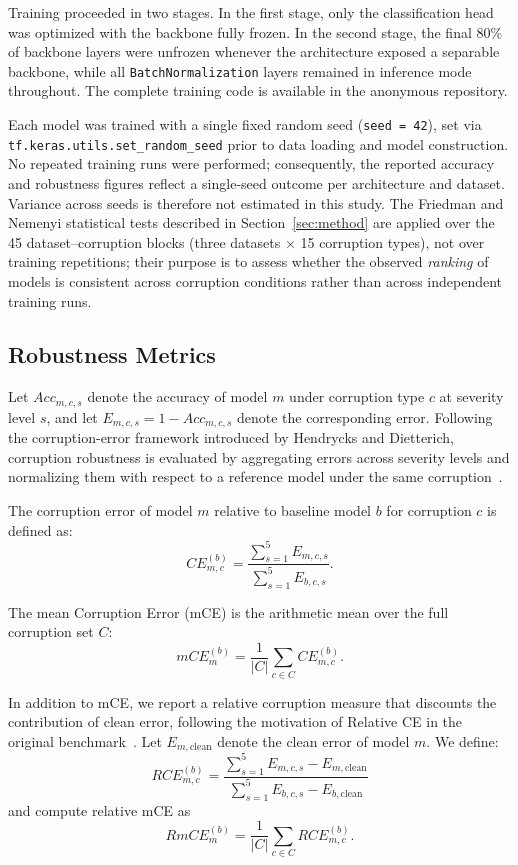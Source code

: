 \documentclass[runningheads]{llncs}
\begin{document}
Training proceeded in two stages. In the first stage, only the classification
head was optimized with the backbone fully frozen. In the second stage, the
final 80\% of backbone layers were unfrozen whenever the architecture exposed
a separable backbone, while all \texttt{BatchNormalization} layers remained in
inference mode throughout. The complete training code is available in the
anonymous repository.

Each model was trained with a single fixed random seed (\texttt{seed\,=\,42}),
set via \texttt{tf.keras.utils.set\_random\_seed} prior to data loading and
model construction. No repeated training runs were performed; consequently,
the reported accuracy and robustness figures reflect a single-seed outcome per
architecture and dataset. Variance across seeds is therefore not estimated in
this study. The Friedman and Nemenyi statistical tests described in
Section~\ref{sec:method} are applied over the 45 dataset--corruption blocks
(three datasets $\times$ 15 corruption types), not over training repetitions;
their purpose is to assess whether the observed \emph{ranking} of models is
consistent across corruption conditions rather than across independent training
runs.

\subsection{Robustness Metrics}
Let $Acc_{m,c,s}$ denote the accuracy of model $m$ under corruption type $c$
at severity level $s$, and let $E_{m,c,s}=1-Acc_{m,c,s}$ denote the
corresponding error. Following the corruption-error framework introduced by
Hendrycks and Dietterich, corruption robustness is evaluated by aggregating
errors across severity levels and normalizing them with respect to a reference
model under the same corruption~\cite{hendrycks2019benchmarking}.

The corruption error of model $m$ relative to baseline model $b$ for
corruption $c$ is defined as:
\begin{equation}
CE_{m,c}^{(b)} =
\frac{\sum_{s=1}^{5} E_{m,c,s}}
     {\sum_{s=1}^{5} E_{b,c,s}}.
\end{equation}

The mean Corruption Error (mCE) is the arithmetic mean over the full
corruption set $C$:
\begin{equation}
mCE_{m}^{(b)} = \frac{1}{|C|}\sum_{c \in C} CE_{m,c}^{(b)}.
\end{equation}

In addition to mCE, we report a relative corruption measure that discounts
the contribution of clean error, following the motivation of Relative CE in
the original benchmark~\cite{hendrycks2019benchmarking}. Let
$E_{m,\mathrm{clean}}$ denote the clean error of model $m$. We define:
\begin{equation}
RCE_{m,c}^{(b)} =
\frac{\sum_{s=1}^{5} E_{m,c,s} - E_{m,\mathrm{clean}}}
     {\sum_{s=1}^{5} E_{b,c,s} - E_{b,\mathrm{clean}}}
\end{equation}
and compute relative mCE as
\begin{equation}
RmCE_{m}^{(b)} = \frac{1}{|C|}\sum_{c \in C} RCE_{m,c}^{(b)}.
\end{equation}
\end{document}
